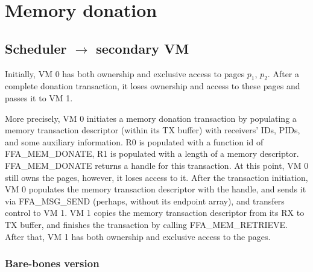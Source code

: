 \documentclass{article}
\begin{document}
\tableofcontents

\section{Memory donation}

\subsection{Scheduler $\rightarrow$ secondary VM}
Initially, VM 0 has both ownership and exclusive access to pages $p_1$, $p_2$. After a complete donation transaction, it loses ownership and access to these pages and passes it to VM 1.

More precisely, VM 0 initiates a memory donation transaction by populating a memory transaction descriptor (within its TX buffer) with receivers' IDs, PIDs, and some auxiliary information. R0 is populated with a function id of FFA\_MEM\_DONATE, R1 is populated with a length of a memory descriptor. FFA\_MEM\_DONATE returns a handle for this transaction. At this point, VM 0 still owns the pages, however, it loses access to it. After the transaction initiation, VM 0 populates the memory transaction descriptor with the handle, and sends it via FFA\_MSG\_SEND (perhaps, without its endpoint array), and transfers control to VM 1. VM 1 copies the memory transaction descriptor from its RX to TX buffer, and finishes the transaction by calling FFA\_MEM\_RETRIEVE. After that, VM 1 has both ownership and exclusive access to the pages.

\subsubsection{Bare-bones version}
\end{document}
